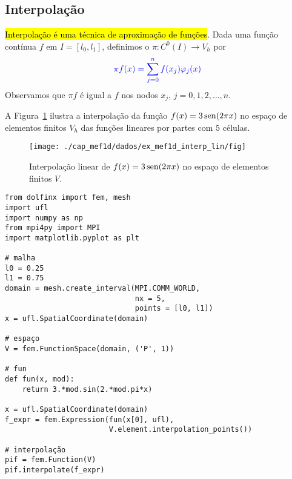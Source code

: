\subsection{Interpolação}
\badgeRevisar

\hl{Interpolação é uma técnica de aproximação de funções}. Dada uma função contínua $f$ em $I=[l_0, l_1]$, definimos o  $\pi: C^0(I)\to V_h$ por
\begin{equation}\color{blue}\pi f (x) = \sum_{j=0}^{n}f(x_j)\varphi_j(x)
\end{equation}
Observamos que $\pi f$ é igual a $f$ nos nodos $x_j$, $j=0, 1, 2, \dotsc, n$. 

\begin{ex}\label{ex:mef1d_interp_lin}
  A Figura~\ref{fig:ex_mef1d_interp_lin} ilustra a interpolação da função $f(x)=3\operatorname{sen}(2\pi x)$ no espaço de elementos finitos $V_h$ das funções lineares por partes com $5$ células.

  \begin{figure}[H]
    \centering
    \texttt{[image: ./cap\_mef1d/dados/ex\_mef1d\_interp\_lin/fig]}
    \caption{Interpolação linear de $f(x)=3\operatorname{sen}(2\pi x)$ no espaço de elementos finitos $V$.}
    \label{fig:ex_mef1d_interp_lin}
  \end{figure}


\begin{lstlisting}[caption=mef1d\_interp\_lin]
from dolfinx import fem, mesh
import ufl
import numpy as np
from mpi4py import MPI
import matplotlib.pyplot as plt

# malha
l0 = 0.25
l1 = 0.75
domain = mesh.create_interval(MPI.COMM_WORLD,
                              nx = 5,
                              points = [l0, l1])
x = ufl.SpatialCoordinate(domain)

# espaço
V = fem.FunctionSpace(domain, ('P', 1))

# fun
def fun(x, mod):
    return 3.*mod.sin(2.*mod.pi*x)

x = ufl.SpatialCoordinate(domain)
f_expr = fem.Expression(fun(x[0], ufl),
                        V.element.interpolation_points())

# interpolação
pif = fem.Function(V)
pif.interpolate(f_expr)
\end{lstlisting}
\end{ex}

